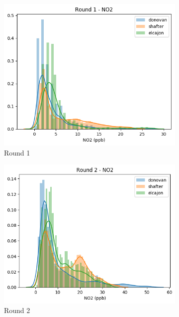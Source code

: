 \documentclass{article}
\begin{document}
\begin{figure}
\centering
\begin{subfigure}{0.32\textwidth}
\includegraphics[width=\textwidth]{results/distributions/round1_no2.png}
\caption{Round 1}
\end{subfigure}
\begin{subfigure}{0.32\textwidth}
\includegraphics[width=\textwidth]{results/distributions/round2_no2.png}
\caption{Round 2}
\end{subfigure}
\begin{subfigure}{0.32\textwidth}

\end{subfigure}
\end{figure}
\end{document}
